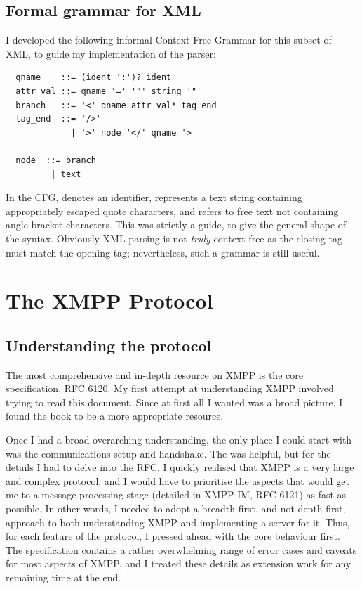 \documentclass[12pt,a4paper,twoside,openright]{report}
\begin{document}
{\subsection{Formal grammar for XML}
I developed the following informal Context-Free Grammar for this subset of XML, to guide my implementation of the parser:

\hspace*{-\parindent}%
\begin{minipage}{\linewidth}
  \begin{lstlisting}
  qname    ::= (ident ':')? ident
  attr_val ::= qname '=' '"' string '"'
  branch   ::= '<' qname attr_val* tag_end
  tag_end  ::= '/>'
             | '>' node '</' qname '>'

  node  ::= branch
         | text

  \end{lstlisting}
\end{minipage}

In the CFG,  denotes an identifier,  represents a text string containing appropriately escaped quote characters, and  refers to free text not containing angle bracket characters. This was strictly a guide, to give the general shape of the syntax. Obviously XML parsing is not \emph{truly} context-free as the closing tag must match the opening tag; nevertheless, such a grammar is still useful.

\section{The XMPP Protocol}

\subsection{Understanding the protocol}
The most comprehensive and in-depth resource on XMPP is the core specification, RFC 6120. My first attempt at understanding XMPP involved trying to read this document. Since at first all I wanted was a broad picture, I found the book  to be a more appropriate resource.

Once I had a broad overarching understanding, the only place I could start with was the communications setup and handshake. The  was helpful, but for the details I had to delve into the RFC. I quickly realised that XMPP is a very large and complex protocol, and I would have to prioritise the aspects that would get me to a message-processing stage (detailed in XMPP-IM, RFC 6121) as fast as possible. In other words, I needed to adopt a breadth-first, and not depth-first, approach to both understanding XMPP and implementing a server for it. Thus, for each feature of the protocol, I pressed ahead with the core behaviour first. The specification contains a rather overwhelming range of error cases and caveats for most aspects of XMPP, and I treated these details as extension work for any remaining time at the end.

}
\end{document}
